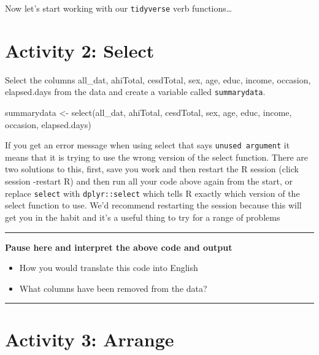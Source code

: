 \documentclass[
  oneside]{book}
\newenvironment{Shaded}{\begin{snugshade}}{\end{snugshade}}
\newcommand{\FunctionTok}[1]{\textcolor[rgb]{0.00,0.00,0.00}{#1}}
\newcommand{\NormalTok}[1]{#1}
\newcommand{\OtherTok}[1]{\textcolor[rgb]{0.56,0.35,0.01}{#1}}
\providecommand{\tightlist}{%
  \setlength{\itemsep}{0pt}\setlength{\parskip}{0pt}}
\begin{document}
Now let's start working with our \texttt{tidyverse} verb functions\ldots{}

\hypertarget{activity-2-select}{%
\section{Activity 2: Select}\label{activity-2-select}}

Select the columns all\_dat, ahiTotal, cesdTotal, sex, age, educ, income, occasion, elapsed.days from the data and create a variable called \texttt{summarydata}.

\begin{Shaded}
\begin{Highlighting}[]
\NormalTok{summarydata }\OtherTok{\textless{}{-}} \FunctionTok{select}\NormalTok{(all\_dat, ahiTotal, cesdTotal, sex, age, educ, income, occasion, elapsed.days)}
\end{Highlighting}
\end{Shaded}

\begin{danger}
If you get an error message when using select that says
\texttt{unused\ argument} it means that it is trying to use the wrong
version of the select function. There are two solutions to this, first,
save you work and then restart the R session (click session -restart R)
and then run all your code above again from the start, or replace
\texttt{select} with \texttt{dplyr::select} which tells R exactly which
version of the select function to use. We'd recommend restarting the
session because this will get you in the habit and it's a useful thing
to try for a range of problems
\end{danger}

\begin{center}\rule{0.5\linewidth}{0.5pt}\end{center}

\textbf{Pause here and interpret the above code and output}

\begin{itemize}
\tightlist
\item
  How you would translate this code into English
\item
  What columns have been removed from the data?
\end{itemize}

\begin{center}\rule{0.5\linewidth}{0.5pt}\end{center}

\hypertarget{activity-3-arrange}{%
\section{Activity 3: Arrange}\label{activity-3-arrange}}
\end{document}
